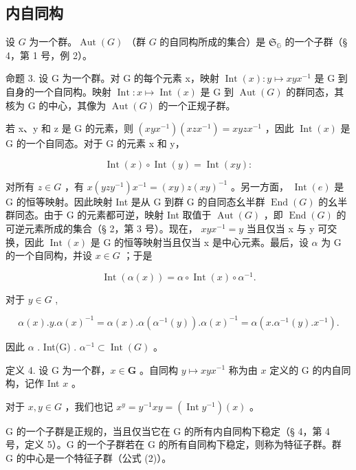 \subsection{内自同构}

设 \(G\) 为一个群。\(\operatorname{Aut}(G)\) （群 \(G\) 的自同构所成的集合）是 \(\mathfrak{S}_{\mathbb{G}}\) 的一个子群（§ 4，第 1 号，例 2）。

命题 3. 设 G 为一个群。对 G 的每个元素 x，映射 \(\operatorname{Int}(x): y \mapsto xyx^{-1}\) 是 G 到自身的一个自同构。映射 \(\operatorname{Int}: x \mapsto \operatorname{Int}(x)\) 是 G 到 \(\operatorname{Aut}(G)\) 的群同态，其核为 G 的中心，其像为 \(\operatorname{Aut}(G)\) 的一个正规子群。

若 x、y 和 z 是 G 的元素，则 \((xyx^{-1})(xzx^{-1}) = xyzx^{-1}\) ，因此 \(\operatorname{Int}(x)\) 是 G 的一个自同态。对于 G 的元素 x 和 y，

\[
\operatorname{Int} (x) \circ \operatorname{Int} (y) = \operatorname{Int} (x y):
\]

对所有 \(z \in G\) ，有 \(x(yzy^{-1})x^{-1} = (xy)z(xy)^{-1}\) 。另一方面， \(\operatorname{Int}(e)\) 是 G 的恒等映射。因此映射 Int 是从 G 到群 G 的自同态幺半群 \(\operatorname{End}(G)\) 的幺半群同态。由于 G 的元素都可逆，映射 Int 取值于 \(\operatorname{Aut}(G)\) ，即 \(\operatorname{End}(G)\) 的可逆元素所成的集合（§ 2，第 3 号）。现在， \(xyx^{-1} = y\) 当且仅当 x 与 y 可交换，因此 \(\operatorname{Int}(x)\) 是 G 的恒等映射当且仅当 x 是中心元素。最后，设 \(\alpha\) 为 G 的一个自同构，并设 \(x \in G\) ；于是

\[
\operatorname{Int} (\alpha (x)) = \alpha \circ \operatorname{Int} (x) \circ \alpha^ {- 1}.\tag{2}
\]

对于 \(y \in G\) ,

\[
\alpha (x). y. \alpha (x) ^ {- 1} = \alpha (x). \alpha (\alpha^ {- 1} (y)). \alpha (x) ^ {- 1} = \alpha (x. \alpha^ {- 1} (y). x ^ {- 1}).
\]

因此 \(\alpha\) . Int(G) . \(\alpha^{-1} \subset \operatorname{Int}(G)\) 。

定义 4. 设 G 为一个群，\(x \in \mathbf{G}\) 。自同构 \(y \mapsto xyx^{-1}\) 称为由 \(x\) 定义的 G 的内自同构，记作 Int \(x\) 。

对于 \(x, y \in G\) ，我们也记 \(x^y = y^{-1}xy = (\operatorname{Int} y^{-1})(x)\) 。

G 的一个子群是正规的，当且仅当它在 G 的所有内自同构下稳定（§ 4，第 4 号，定义 5）。G 的一个子群若在 G 的所有自同构下稳定，则称为特征子群。群 G 的中心是一个特征子群（公式 (2)）。

